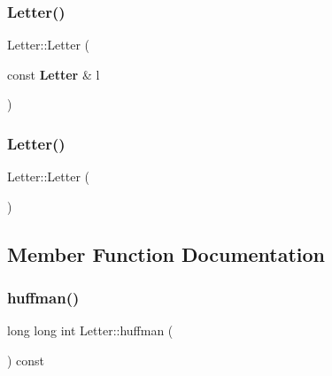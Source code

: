 \mbox{\label{class_letter_aad5ec69b0312ac41d818337c5ff94e7e}} 
\subsubsection{Letter()\hspace{0.1cm}{\footnotesize\ttfamily [2/3]}}
{\footnotesize\ttfamily Letter\+::\+Letter (\begin{DoxyParamCaption}\item[{const \textbf{ Letter} \&}]{l }\end{DoxyParamCaption})\hspace{0.3cm}{\ttfamily [inline]}}

\mbox{\label{class_letter_ac390dd9bfbdd7a0965cd74b3eccee010}} 
\subsubsection{Letter()\hspace{0.1cm}{\footnotesize\ttfamily [3/3]}}
{\footnotesize\ttfamily Letter\+::\+Letter (\begin{DoxyParamCaption}{ }\end{DoxyParamCaption})\hspace{0.3cm}{\ttfamily [inline]}}



\subsection{Member Function Documentation}
\mbox{\label{class_letter_af52f553dafb323384339dcfaa1a7eaa6}} 
\subsubsection{huffman()\hspace{0.1cm}{\footnotesize\ttfamily [1/2]}}
{\footnotesize\ttfamily long long int Letter\+::huffman (\begin{DoxyParamCaption}{ }\end{DoxyParamCaption}) const\hspace{0.3cm}{\ttfamily [inline]}}

\mbox{\label{class_letter_ac345d7df6c98a9aea64f77d55267f820}} 
